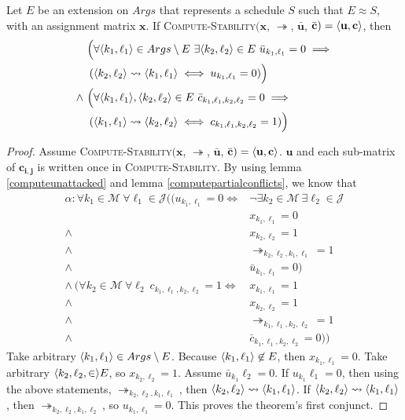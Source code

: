 \begin{theorem}
	\label{computestability}

	Let $E$ be an extension on $Args$ that represents a schedule $S$ such that $E\approx S$, with an assignment matrix $\mathbf{x}$.
	\linespace
	If \textsc{Compute-Stability}$(\mathbf{x}$, $\twoheadrightarrow$, $\bar{\mathbf{u}}$, $\bar{\mathbf{c}})=\langle{\mathbf{u}},{\mathbf{c}}\rangle$, then
	\begin{align*}
	\Big(&\forall\pair{k_1}{\ell_1}\in Args\setminus E\ \exists\pair{k_2}{\ell_2}\in E\ \bar{u}_{k_1,\ell_1}=0\implies\\
	(&\pair{k_2}{\ell_2}\rightsquigarrow\pair{k_1}{\ell_1}\iff u_{k_1,\ell_1}=0)\Big)\\
	\land\ \Big(&\forall\pair{k_1}{\ell_1},\pair{k_2}{\ell_2}\in E\ \bar{c}_{k_1,\ell_1,k_2,\ell_2}=0\implies\\
	(&\pair{k_1}{\ell_1}\rightsquigarrow\pair{k_2}{\ell_2}\iff c_{k_1,\ell_1,k_2,\ell_2}=1)\Big)
	\end{align*}
	\begin{proof}
		Assume \textsc{Compute-Stability}$(\mathbf{x}$, $\twoheadrightarrow$, $\bar{\mathbf{u}}$, $\bar{\mathbf{c}})=\langle{\mathbf{u}},{\mathbf{c}}\rangle$. $\mathbf{u}$ and each sub-matrix of $\mathbf{c_{i,j}}$ is written once in \textsc{Compute-Stability}. By using lemma \ref{computeunattacked} and lemma \ref{computepartialconflicts}, we know that
		\begin{align*}
			\alpha: \forall k_1\in\mathcal{M}\ \forall\ell_1\in\mathcal{J}((u_{k_1,\ell_1}=0\iff&\neg\exists k_2\in\mathcal{M}\ \exists\ell_2\in\mathcal{J}\\
			&x_{k_1,\ell_1}=0\\
			\land\ &x_{k_2,\ell_2}=1\\
			\land\ &\twoheadrightarrow_{k_2,\ell_2,k_1,\ell_1}=1\\
			\land\ &\bar{u}_{k_1,\ell_1}=0)\\
			\land\ (\forall k_2\in\mathcal{M}\ \forall\ell_2\ c_{k_1,\ell_1,k_2,\ell_2}=1\iff&x_{k_1,\ell_1}=1\\
			\land\ &x_{k_2,\ell_2}=1\\
			\land\ &\twoheadrightarrow_{k_1,\ell_1,k_2,\ell_2}=1\\
			\land\ &\bar{c}_{k_1,\ell_1,k_2,\ell_2}=0))
		\end{align*}
		Take arbitrary $\langle{k_1},{\ell_1}\rangle\in Args\setminus E$. Because $\langle{k_1},{\ell_1}\rangle\not\in E$, then $x_{k_1,\ell_1}=0$. Take arbitrary $\langle{k_2,\ell_2},{\in}\rangle E$, so $x_{k_2,\ell_2}=1$. Assume $\bar{u}_{k_1}{\ell_2}=0$. If $u_{k_1}{\ell_1}=0$, then using the above statements, $\twoheadrightarrow_{k_2,\ell_2,k_1,\ell_1}$, then $\langle{k_2},{\ell_2}\rangle\rightsquigarrow\langle{k_1},{\ell_1}\rangle$. If $\langle{k_2},{\ell_2}\rangle\rightsquigarrow\langle{k_1},{\ell_1}\rangle$, then $\twoheadrightarrow_{k_2,\ell_2,k_1,\ell_2}$, so $u_{k_1,\ell_1}=0$. This proves the theorem's first conjunct.

\end{proof}
\end{theorem}
